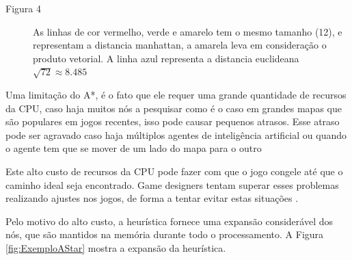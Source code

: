 \begin{description}
    \item[Figura 4] As linhas de cor vermelho, verde e amarelo tem o mesmo tamanho (12), e representam a distancia manhattan, a amarela leva em consideração o produto vetorial.
    A linha azul representa a distancia euclideana $\sqrt{72} \approx 8.485$
\end{description}

Uma limitação do A*, é o fato que ele requer uma grande quantidade de recursos da CPU, caso haja muitos nós a pesquisar como é o caso em grandes mapas que são populares em jogos recentes, isso  pode causar pequenos atrasos.
Esse atraso pode ser agravado caso haja múltiplos agentes de inteligência artificial ou quando o agente tem que se mover de um lado do mapa para o outro 

Este alto custo de recursos da CPU pode fazer com que o jogo congele até que o caminho ideal seja encontrado. Game designers tentam superar esses problemas realizando ajustes nos jogos, de forma a tentar evitar estas situações \cite{Timothy}.

Pelo motivo do alto custo, a heurística fornece uma expansão considerável dos nós, que são mantidos na memória durante todo o processamento. A Figura \ref{fig:ExemploAStar} mostra a expansão da heurística.

\begin{minipage}{\linewidth}
    \label{fig:ExemploAStar}
\end{minipage}

